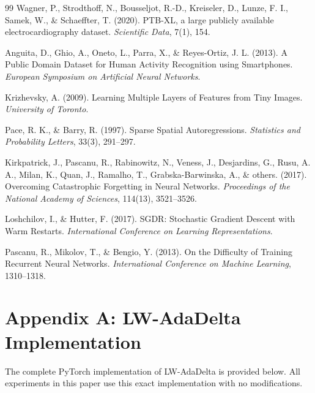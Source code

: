 \documentclass[11pt,a4paper]{article}
\begin{document}
\begin{thebibliography}{99}
Wagner, P., Strodthoff, N., Bousseljot, R.-D., Kreiseler, D., Lunze, F. I., Samek, W., \& Schaeffter, T. (2020). PTB-XL, a large publicly available electrocardiography dataset. \textit{Scientific Data}, 7(1), 154.

Anguita, D., Ghio, A., Oneto, L., Parra, X., \& Reyes-Ortiz, J. L. (2013). A Public Domain Dataset for Human Activity Recognition using Smartphones. \textit{European Symposium on Artificial Neural Networks}.

Krizhevsky, A. (2009). Learning Multiple Layers of Features from Tiny Images. \textit{University of Toronto}.

Pace, R. K., \& Barry, R. (1997). Sparse Spatial Autoregressions. \textit{Statistics and Probability Letters}, 33(3), 291--297.

Kirkpatrick, J., Pascanu, R., Rabinowitz, N., Veness, J., Desjardins, G., Rusu, A. A., Milan, K., Quan, J., Ramalho, T., Grabska-Barwinska, A., \& others. (2017). Overcoming Catastrophic Forgetting in Neural Networks. \textit{Proceedings of the National Academy of Sciences}, 114(13), 3521--3526.

Loshchilov, I., \& Hutter, F. (2017). SGDR: Stochastic Gradient Descent with Warm Restarts. \textit{International Conference on Learning Representations}.

Pascanu, R., Mikolov, T., \& Bengio, Y. (2013). On the Difficulty of Training Recurrent Neural Networks. \textit{International Conference on Machine Learning}, 1310--1318.

\end{thebibliography}

\appendix

\section*{Appendix A: LW-AdaDelta Implementation}

The complete PyTorch implementation of LW-AdaDelta is provided below. All experiments in this paper use this exact implementation with no modifications.
\end{document}

